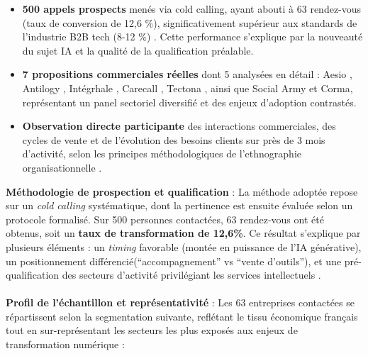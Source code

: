 \begin{itemize}
    \item \textbf{500 appels prospects} menés via cold calling, ayant abouti à 63 rendez-vous (taux de conversion de 12,6 \%), significativement supérieur aux standards de l'industrie B2B tech (8-12 \%) \cite{salesforce2024conversion}. Cette performance s'explique par la nouveauté du sujet IA et la qualité de la qualification préalable.
    \item \textbf{7 propositions commerciales réelles} dont 5 analysées en détail : Aesio \cite{luwai2025aesio}, Antilogy \cite{luwai2025antilogy}, Intégrhale \cite{luwai2025integrhale}, Carecall \cite{luwai2025carecall}, Tectona \cite{luwai2025tectona}, ainsi que Social Army et Corma, représentant un panel sectoriel diversifié et des enjeux d'adoption contrastés.
    \item \textbf{Observation directe participante} des interactions commerciales, des cycles de vente et de l'évolution des besoins clients sur près de 3 mois d'activité, selon les principes méthodologiques de l'ethnographie organisationnelle \cite{yanow2012interpretive}.
\end{itemize}
\medskip
\textbf{Méthodologie de prospection et qualification} : La méthode adoptée repose sur un \emph{cold calling} systématique, dont la pertinence est ensuite évaluée selon un protocole formalisé. Sur 500 personnes contactées, 63 rendez-vous ont été obtenus, soit un \textbf{taux de transformation de 12,6\%}. Ce résultat s’explique par plusieurs éléments : un \emph{timing} favorable (montée en puissance de l’IA générative), un positionnement différencié(\enquote{accompagnement} vs \enquote{vente d’outils}), et une pré-qualification des secteurs d’activité privilégiant les services intellectuels \cite{kotler2017marketing}.
\\\\
\textbf{Profil de l'échantillon et représentativité} : Les 63 entreprises contactées se répartissent selon la segmentation suivante, reflétant le tissu économique français tout en sur-représentant les secteurs les plus exposés aux enjeux de transformation numérique \cite{insee2024pme} :

